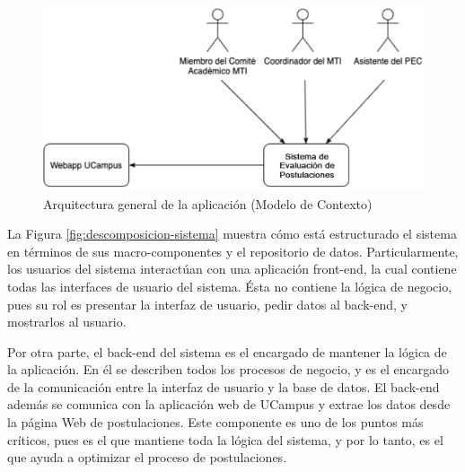 \begin{figure}[!ht]
    \begin{center}
        \includegraphics[scale=0.2]{imagenes/03-arquitectura.png}
    \end{center}
    \caption{Arquitectura general de la aplicación (Modelo de Contexto)}
    \label{fig:arquitectura}
\end{figure}

La Figura \ref{fig:descomposicion-sistema} muestra cómo está estructurado el
sistema en términos de sus macro-componentes y el repositorio de datos.
Particularmente, los usuarios del sistema interactúan con una aplicación
front-end, la cual contiene todas las interfaces de usuario del sistema. Ésta no
contiene la lógica de negocio, pues su rol es presentar la interfaz de usuario,
pedir datos al back-end, y mostrarlos al usuario.

Por otra parte, el back-end del sistema es el encargado de mantener la lógica de
la aplicación. En él se describen todos los procesos de negocio, y es el
encargado de la comunicación entre la interfaz de usuario y la base de datos. El
back-end además se comunica con la aplicación web de UCampus y extrae los datos
desde la página Web de postulaciones. Este componente es uno de los puntos más
críticos, pues es el que mantiene toda la lógica del sistema, y por lo tanto, es
el que ayuda a optimizar el proceso de postulaciones.


